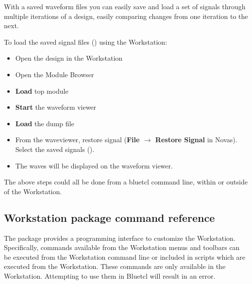 
With a saved waveform files you can easily save and load a set of
signals through multiple iterations of a design, easily comparing
changes from one iteration to the next.

To load the saved signal files ()  using the Workstation:
\begin{itemize}
\item Open the design in the Workstation

\item Open the Module Browser

\item {\bf Load} top module

\item {\bf Start} the waveform viewer

\item {\bf Load} the dump file

\item From the waveviewer, restore signal ({\bf File $\rightarrow$ 
Restore Signal} in Novas).  Select the saved signals ().

\item The waves will be displayed on the waveform viewer.
\end{itemize}

The above steps could all be done from a bluetcl command line, within
or outside of the Workstation.






\subsection{Workstation package command reference}
 The  package provides a
programming interface  to customize
the Workstation.  Specifically,  commands available from the Workstation menus
and toolbars can be executed from the Workstation command line or  included in  scripts which are executed
from the Workstation.   These commands are only available in the
Workstation.  Attempting to use them in Bluetcl will
result in an error.

